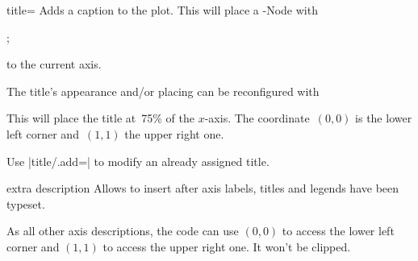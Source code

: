 \begin{pgfplotskey}{title=}
Adds a caption to the plot. This will place a \Tikz-Node with
\begin{codeexample}
;
\end{codeexample}
to the current axis.
\begin{codeexample}[]
%
\end{codeexample}
% 
The title's appearance and/or placing can be reconfigured with
\begin{codeexample}
\end{codeexample}
This will place the title at~75\% of the $x$-axis. The coordinate~$(0,0)$ is the lower left corner and~$(1,1)$ the upper right one.

Use |title/.add=| to modify an already assigned title.
\end{pgfplotskey}

\begin{pgfplotscodekey}{extra description}
Allows to insert  after axis labels, titles and legends have been typeset.

As all other axis descriptions, the code can use $(0,0)$ to access the lower left corner and $(1,1)$ to access the upper right one. It won't be clipped.
\begin{codeexample}[]
\end{codeexample}
\end{pgfplotscodekey}


